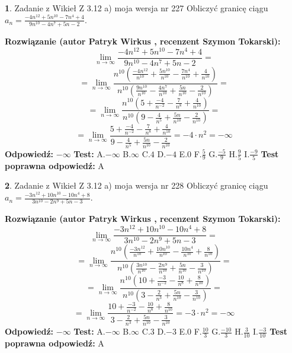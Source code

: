 \documentclass[12pt, a4paper]{article}
\theoremstyle{definition} %
\newtheorem{zad}{}
\newcommand{\zadStart}[1]{\begin{zad}#1\newline}
\newcommand{\zadStop}{\end{zad}}
\newcommand{\rozwStart}[2]{\noindent \textbf{Rozwiązanie (autor #1 , recenzent #2): }\newline}
\newcommand{\rozwStop}{\newline}
\newcommand{\odpStart}{\noindent \textbf{Odpowiedź:}\newline}
\newcommand{\odpStop}{\newline}
\newcommand{\testStart}{\noindent \textbf{Test:}\newline}
\newcommand{\testStop}{\newline}
\newcommand{\kluczStart}{\noindent \textbf{Test poprawna odpowiedź:}\newline}
\newcommand{\kluczStop}{\newline}
\begin{document}
\zadStart{Zadanie z Wikieł Z 3.12 a) moja wersja nr 227}
Obliczyć granicę ciągu $a_{n}=\frac{-4n^{12}+5n^{10}-7n^{4}+4}{9n^{10}-4n^{7}+5n-2}$.
\zadStop
\rozwStart{Patryk Wirkus}{Szymon Tokarski}
$$\lim\limits_{n\to\infty}\frac{-4n^{12}+5n^{10}-7n^{4}+4}{9n^{10}-4n^{7}+5n-2}=$$
$$=\lim\limits_{n\to\infty}\frac{n^{10}\left(\frac{-4n^{12}}{n^{10}}+\frac{5n^{10}}{n^{10}}-\frac{7n^{4}}{n^{10}}+\frac{4}{n^{10}}\right)}{n^{10}\left(\frac{9n^{10}}{n^{10}}-\frac{4n^{7}}{n^{10}}+\frac{5n}{n^{10}}-\frac{2}{n^{10}}\right)}=$$
$$=\lim\limits_{n\to\infty}\frac{n^{10}\left(5+\frac{-4}{n^{-2}}-\frac{7}{n^{8}}+\frac{4}{n^{10}}\right)}
{n^{10}\left(9-\frac{4}{n^{5}}+\frac{5n}{n^{10}}-\frac{2}{n^{10}}\right)}=$$
$$=\lim\limits_{n\to\infty}\frac{5+\frac{-4}{n^{-2}}-\frac{7}{n^{8}}+\frac{4}{n^{10}}}{9-\frac{4}{n^{5}}+\frac{5n}{n^{10}}-\frac{2}{n^{10}}}=-4\cdot n^{2} = -\infty$$
\rozwStop
\odpStart
$-\infty$
\odpStop
\testStart
A.$-\infty$
B.$\infty$
C.$4$
D.$-4$
E.$0$
F.$\frac{5}{9}$
G.$\frac{-5}{9}$
H.$\frac{9}{5}$
I.$\frac{-9}{5}$
\testStop
\kluczStart
A
\kluczStop



\zadStart{Zadanie z Wikieł Z 3.12 a) moja wersja nr 228}
Obliczyć granicę ciągu $a_{n}=\frac{-3n^{12}+10n^{10}-10n^{4}+8}{3n^{10}-2n^{9}+5n-3}$.
\zadStop
\rozwStart{Patryk Wirkus}{Szymon Tokarski}
$$\lim\limits_{n\to\infty}\frac{-3n^{12}+10n^{10}-10n^{4}+8}{3n^{10}-2n^{9}+5n-3}=$$
$$=\lim\limits_{n\to\infty}\frac{n^{10}\left(\frac{-3n^{12}}{n^{10}}+\frac{10n^{10}}{n^{10}}-\frac{10n^{4}}{n^{10}}+\frac{8}{n^{10}}\right)}{n^{10}\left(\frac{3n^{10}}{n^{10}}-\frac{2n^{9}}{n^{10}}+\frac{5n}{n^{10}}-\frac{3}{n^{10}}\right)}=$$
$$=\lim\limits_{n\to\infty}\frac{n^{10}\left(10+\frac{-3}{n^{-2}}-\frac{10}{n^{8}}+\frac{8}{n^{10}}\right)}
{n^{10}\left(3-\frac{2}{n^{3}}+\frac{5n}{n^{10}}-\frac{3}{n^{10}}\right)}=$$
$$=\lim\limits_{n\to\infty}\frac{10+\frac{-3}{n^{-2}}-\frac{10}{n^{8}}+\frac{8}{n^{10}}}{3-\frac{2}{n^{3}}+\frac{5n}{n^{10}}-\frac{3}{n^{10}}}=-3\cdot n^{2} = -\infty$$
\rozwStop
\odpStart
$-\infty$
\odpStop
\testStart
A.$-\infty$
B.$\infty$
C.$3$
D.$-3$
E.$0$
F.$\frac{10}{3}$
G.$\frac{-10}{3}$
H.$\frac{3}{10}$
I.$\frac{-3}{10}$
\testStop
\kluczStart
A
\kluczStop
\end{document}
